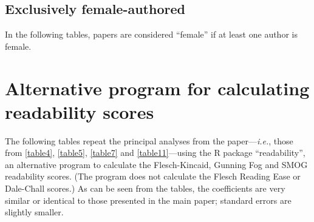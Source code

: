 \begin{appendices}










\clearpage

\subsection{Exclusively female-authored}
\label{appendixexclusive}

In the following tables, papers are considered ``female'' if at least one author is female.











\clearpage

\section{Alternative program for calculating readability scores}
\label{appendixalternativereadability}

The following tables repeat the principal analyses from the paper---\emph{i.e.}, those from \autoref{table4}, \autoref{table5}, \autoref{table7} and \autoref{table11}---using the R package ``readability'', an alternative program to calculate the Flesch-Kincaid, Gunning Fog and SMOG readability scores. (The program does not calculate the Flesch Reading Ease or Dale-Chall scores.) As can be seen from the tables, the coefficients are very similar or identical to those presented in the main paper; standard errors are slightly smaller.




\end{appendices}
